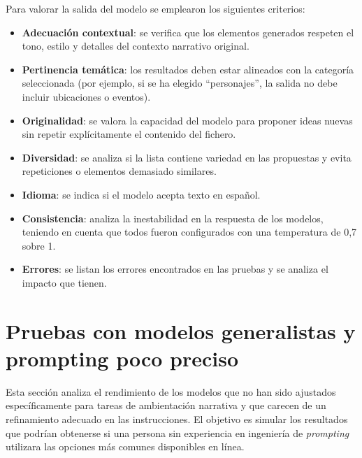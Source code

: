 Para valorar la salida del modelo se emplearon los siguientes criterios:
\begin{itemize}
\item \textbf{Adecuación contextual}: se verifica que los elementos generados respeten el tono, estilo y detalles del contexto narrativo original.
\item \textbf{Pertinencia temática}: los resultados deben estar alineados con la categoría seleccionada
(por ejemplo, si se ha elegido ``personajes'', la salida no debe incluir ubicaciones o eventos).
\item \textbf{Originalidad}: se valora la capacidad del modelo para proponer ideas nuevas sin repetir explícitamente el contenido del fichero.
\item \textbf{Diversidad}: se analiza si la lista contiene variedad en las propuestas y evita repeticiones o elementos demasiado similares.
\item \textbf{Idioma}: se indica si el modelo acepta texto en español. 
\item \textbf{Consistencia}: analiza la inestabilidad en la respuesta de los modelos,
teniendo en cuenta que todos fueron configurados con una temperatura de 0,7 sobre 1. 
\item \textbf{Errores}: se listan los errores encontrados en las pruebas y se analiza el impacto que tienen.
\end{itemize}

\section{Pruebas con modelos generalistas y prompting poco preciso}
Esta sección analiza el rendimiento de los modelos que no han sido ajustados específicamente
para tareas de ambientación narrativa y que carecen de un refinamiento adecuado en las instrucciones.
El objetivo es simular los resultados que podrían obtenerse si una persona sin experiencia en ingeniería de
\textit{prompting} utilizara las opciones más comunes disponibles en línea.

